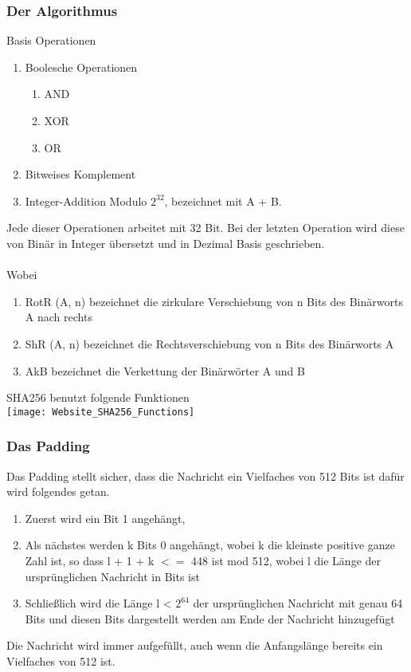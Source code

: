 {\subsubsection{Der Algorithmus}
Basis Operationen
\begin{enumerate}
\item Boolesche Operationen
\begin{enumerate}
\item AND
\item XOR
\item OR
\end{enumerate}
\item Bitweises Komplement
\item Integer-Addition Modulo $2^{32}$, bezeichnet mit A + B.
\end{enumerate}
Jede dieser Operationen arbeitet mit 32 Bit. Bei der letzten Operation wird diese von Binär in Integer übersetzt und in Dezimal Basis geschrieben.\\ \\
Wobei
\begin{enumerate}
\item RotR (A, n) bezeichnet die zirkulare Verschiebung von n Bits des Binärworts A nach rechts
\item ShR (A, n) bezeichnet die Rechtsverschiebung von n Bits des Binärworts A
\item AkB bezeichnet die Verkettung der Binärwörter A und B
\end{enumerate}
SHA256 benutzt folgende Funktionen\\
\texttt{[image: Website\_SHA256\_Functions]}
\subsubsection{Das Padding}
Das Padding stellt sicher, dass die Nachricht ein Vielfaches von 512 Bits ist dafür wird folgendes getan.
\begin{enumerate}
\item Zuerst wird ein Bit 1 angehängt,
\item Als nächstes werden k Bits 0 angehängt, wobei k die kleinste positive ganze Zahl ist, so dass l + 1 + k $<=$ 448 ist
mod 512, wobei l die Länge der ursprünglichen Nachricht in Bits ist
\item Schließlich wird die Länge l < $2^{64}$ der ursprünglichen Nachricht mit genau 64 Bits und diesen Bits dargestellt
werden am Ende der Nachricht hinzugefügt
\end{enumerate}
Die Nachricht wird immer aufgefüllt, auch wenn die Anfangslänge bereits ein Vielfaches von 512 ist.
}

